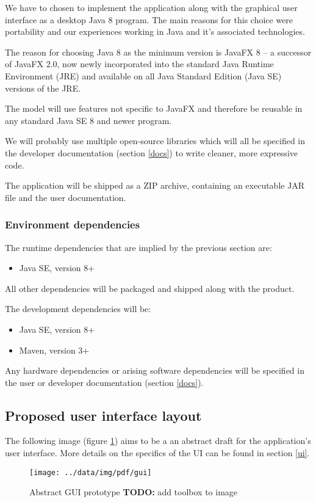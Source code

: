 \documentclass[10pt,a4paper,oneside]{article}
\newcommand{\TODO}[1]{{\textbf{TODO:} #1}} %
\begin{document}
We have to chosen to implement the application along with the graphical user interface as a
desktop Java 8 program. The main reasons for this choice were portability and our experiences working in Java and it's associated technologies.

The reason for choosing Java 8 as the minimum version is JavaFX 8 -- a successor of JavaFX 2.0, now newly incorporated into
the standard Java Runtime Environment (JRE) and available on all Java Standard Edition (Java SE) versions of the JRE.

The model will use features not specific to JavaFX and therefore be reusable in any standard Java SE 8 and newer program.

We will probably use multiple open-source libraries which will all be specified in the developer documentation (section \ref{docs})
to write cleaner, more expressive code.

The application will be shipped as a ZIP archive, containing an executable JAR file and the user documentation.

\subsubsection{Environment dependencies}

The runtime dependencies that are implied by the previous section are:
\begin{itemize}
\item Java SE, version 8+
\end{itemize}
All other dependencies will be packaged and shipped along with the product.

The development dependencies will be:
\begin{itemize}
\item Java SE, version 8+
\item Maven, version 3+
\end{itemize}

Any hardware dependencies or arising software dependencies will be specified in the user or developer documentation (section \ref{docs}).

\subsection{Proposed user interface layout} \label{ui-layout}

The following image (figure \ref{fig:gui}) aims to be a an abstract draft for the application's user interface.
More details on the specifics of the UI can be found in section \ref{ui}.
\begin{figure}[h]
        \centering
        \texttt{[image: ../data/img/pdf/gui]}
        \caption{Abstract GUI prototype \TODO add toolbox to image}
        \label{fig:gui}
\end{figure}
\end{document}
